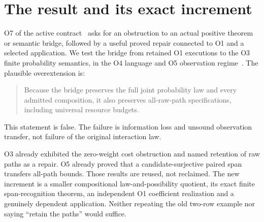 \documentclass[11pt,a4paper]{article}
\theoremstyle{definition}
\begin{document}
\section{The result and its exact increment}\label{sec:scope}
O7 of the active contract~\cite{Contract} asks for an obstruction to an
actual positive theorem or semantic bridge, followed by a useful proved
repair connected to O1 and a selected application. We test the bridge
from retained O1 executions to the O3 finite probability semantics, in
the O4 language and O5 observation regime~\cite{O1,O3,O4,O5}. The
plausible overextension is:
\begin{quote}
Because the bridge preserves the full joint probability law and every
admitted composition, it also preserves all-raw-path specifications,
including universal resource budgets.
\end{quote}
This statement is false. The failure is information loss and unsound
observation transfer, not failure of the original interaction law.

O3 already exhibited the zero-weight cost obstruction and named retention
of raw paths as a repair. O5 already proved that a candidate-surjective
paired span transfers all-path bounds. Those results are reused, not
reclaimed. The new increment is a smaller compositional law-and-possibility
quotient, its exact finite span-recognition theorem, an independent O1
coefficient realization and a genuinely dependent application. Neither
repeating the old two-row example nor saying ``retain the paths'' would
suffice.
\end{document}
